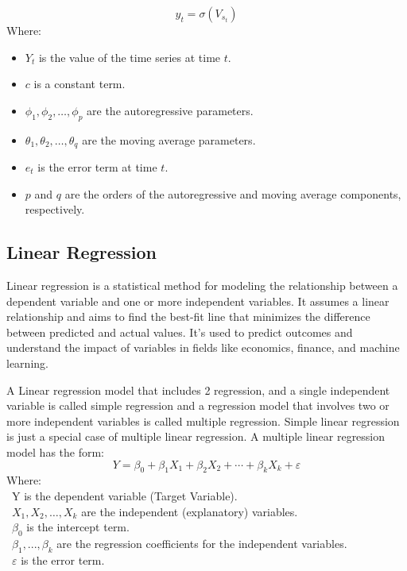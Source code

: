 \documentclass[conference]{IEEEtran}
\begin{document}
\[
y_t = \sigma(V_{s_{t}})
\]
Where:
\begin{itemize}
    \item $Y_t$ is the value of the time series at time $t$.
    \item $c$ is a constant term.
    \item $\phi_1, \phi_2, \ldots, \phi_p$ are the autoregressive parameters.
    \item $\theta_1, \theta_2, \ldots, \theta_q$ are the moving average parameters.
    \item $e_t$ is the error term at time $t$.
    \item $p$ and $q$ are the orders of the autoregressive and moving average components, respectively.
\end{itemize}




\subsection{Linear Regression}
Linear regression is a statistical method for modeling the relationship between a dependent variable and one or more independent variables. It assumes a linear relationship and aims to find the best-fit line that minimizes the difference between predicted and actual values. It's used to predict outcomes and understand the impact of variables in fields like economics, finance, and machine learning.

A Linear regression model that includes 2 regression, and a single independent variable is called simple regression and a regression model that involves two or more independent variables is called multiple regression. Simple linear regression is just a special case of multiple linear regression. A multiple linear regression model has the form: \cite{linearRegressionMethod} \\
\[Y=\beta_0+\beta_1X_1+\beta_2X_2+\cdots+\beta_kX_k+\varepsilon\]
Where:\\
	\indent\textbullet\ Y is the dependent variable (Target Variable).\\
	\indent\textbullet\ \(X_1, X_2, \ldots, X_k\) are the independent (explanatory) variables.\\
	\indent\textbullet\ \(\beta_0\) is the intercept term.\\
	\indent\textbullet\ \(\beta_1,..., \beta_k\) are the regression coefficients for the independent variables.\\
	\indent\textbullet\ \(\varepsilon\) is the error term.
\end{document}
